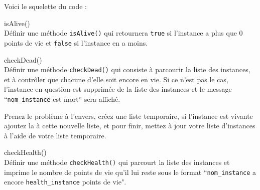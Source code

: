 Voici le squelette du code : \\



\begin{Exercice}[5 minutes] isAlive()\\
    Définir une méthode \lstinline{isAlive()} qui retournera \lstinline{true} si l'instance a plus que 0 points de vie et \lstinline{false} si l'instance en a moins.

\begin{solution}
	
\end{solution}
\end{Exercice}


\begin{Exercice}[10 minutes] checkDead()\\
    Définir une méthode \lstinline{checkDead()} qui consiste à parcourir la liste des instances, et à contrôler que chacune d'elle soit encore en vie. Si ce n'est pas le cas, l'instance en question est supprimée de la liste des instances et le message ``\lstinline{nom_instance} est mort'' sera affiché.
    
\begin{conseil}
Prenez le problème à l'envers, créez une liste temporaire, si l'instance est vivante ajoutez la à cette nouvelle liste, et pour finir, mettez à jour votre liste d'instances à l'aide de votre liste temporaire.
\end{conseil}

\begin{solution}
	
\end{solution}
\end{Exercice}

\begin{Exercice}[5 minutes] checkHealth()\\
    Définir une méthode \lstinline{checkHealth()} qui parcourt la liste des instances et imprime le nombre de points de vie qu'il lui reste sous le format ``\lstinline{nom_instance} a encore \lstinline{health_instance} points de vie". 

\begin{solution}
	
\end{solution}
\end{Exercice}

